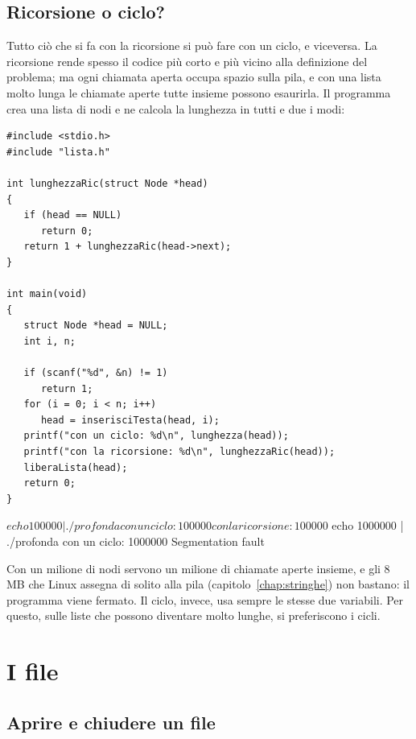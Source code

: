 \subsection{Ricorsione o ciclo?}

Tutto ciò che si fa con la ricorsione si può fare con un ciclo, e viceversa.
La ricorsione rende spesso il codice più corto e più vicino alla definizione
del problema; ma ogni chiamata aperta occupa spazio sulla pila, e con una
lista molto lunga le chiamate aperte tutte insieme possono esaurirla. Il
programma  crea una lista di  nodi e ne calcola la
lunghezza in tutti e due i modi:

\begin{affianco}[0.55][c]
\begin{lstlisting}[style=c, name=profonda.c]
#include <stdio.h>
#include "lista.h"

int lunghezzaRic(struct Node *head)
{
   if (head == NULL)
      return 0;
   return 1 + lunghezzaRic(head->next);
}

int main(void)
{
   struct Node *head = NULL;
   int i, n;

   if (scanf("%d", &n) != 1)
      return 1;
   for (i = 0; i < n; i++)
      head = inserisciTesta(head, i);
   printf("con un ciclo: %d\n", lunghezza(head));
   printf("con la ricorsione: %d\n", lunghezzaRic(head));
   liberaLista(head);
   return 0;
}
\end{lstlisting}
\risultato
\begin{console}
$ echo 100000 | ./profonda
con un ciclo: 100000
con la ricorsione: 100000
$ echo 1000000 | ./profonda
con un ciclo: 1000000
Segmentation fault
\end{console}
\end{affianco}

Con un milione di nodi servono un milione di chiamate aperte insieme, e gli
8 MB che Linux assegna di solito alla pila (capitolo~\ref{chap:stringhe})
non bastano: il programma viene fermato. Il ciclo, invece, usa sempre le
stesse due variabili. Per questo, sulle liste che possono diventare molto
lunghe, si preferiscono i cicli.

\section{I file}

\subsection{Aprire e chiudere un file}


